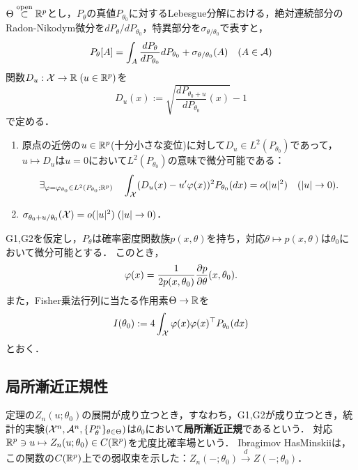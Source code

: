 \documentclass[uplatex,dvipdfmx]{jsreport}
\begin{document}
\begin{notation}[正則性の仮定]
    $\Theta\overset{\mathrm{open}}{\subset}\mathbb{R}^p$とし，$P_\theta$の真値$P_{\theta_0}$に対するLebesgue分解における，絶対連続部分のRadon-Nikodym微分を$dP_\theta/dP_{\theta_0}$，特異部分を$\sigma_{\theta/\theta_0}$で表すと，
    \[P_\theta[A]=\int_A\frac{dP_\theta}{dP_{\theta_0}}dP_{\theta_0}+\sigma_{\theta/\theta_0}(A)\quad(A\in\mathcal{A})\]
    関数$D_u:\mathcal{X}\to\mathbb{R}\;(u\in\mathbb{R}^p)$を
    \[D_u(x):=\sqrt{\frac{dP_{\theta_0+u}}{dP_{\theta_0}}(x)}-1\]
    で定める．
\end{notation}

\begin{enumerate}[({G}1)]
    \item 原点の近傍の$u\in\mathbb{R}^p$(十分小さな変位)に対して$D_u\in L^2(P_{\theta_0})$であって，$u\mapsto D_u$は$u=0$において$L^2(P_{\theta_0})$の意味で微分可能である：
    \[\exists_{\varphi=\varphi_{\theta_0}\in L^2(P_{\theta_0};\mathbb{R}^p)}\quad\int_{\mathcal{X}}(D_u(x)-u'\varphi(x))^2P_{\theta_0}(dx)=o(\lvert u\rvert^2)\quad(\lvert u\rvert\to0).\]
    \item $\sigma_{\theta_0+u/\theta_0}(\mathcal{X})=o(\lvert u\rvert^2)\;(\lvert u\rvert\to0)$．
\end{enumerate}

\begin{lemma}[$L^2$-微分の表示]
    G1,G2を仮定し，$P_\theta$は確率密度関数族$p(x,\theta)$を持ち，対応$\theta\mapsto p(x,\theta)$は$\theta_0$において微分可能とする．
    このとき，
    \[\varphi(x)=\frac{1}{2p(x,\theta_0)}\frac{\partial p}{\partial \theta}(x,\theta_0).\]
    また，Fisher乗法行列に当たる作用素$\Theta\to\mathbb{R}$を
    \[I(\theta_0):=4\int_{\mathcal{X}}\varphi(x)\varphi(x)^\top P_{\theta_0}(dx)\]
    とおく．
\end{lemma}

\begin{lemma}
    
\end{lemma}

\subsection{局所漸近正規性}

\begin{tcolorbox}[colframe=ForestGreen, colback=ForestGreen!10!white,breakable,colbacktitle=ForestGreen!40!white,coltitle=black,fonttitle=\bfseries\sffamily,
title=]
    定理の$Z_n(u;\theta_0)$の展開が成り立つとき，すなわち，G1,G2が成り立つとき，統計的実験$(\mathcal{X}^n,\mathcal{A}^n,\{P^n_\theta\}_{\theta\in\Theta})$は$\theta_0$において\textbf{局所漸近正規}であるという．
    対応$\mathbb{R}^p\ni u\mapsto Z_n(u;\theta_0)\in C(\mathbb{R}^p)$を尤度比確率場という．
    Ibragimov HasMinskiiは，この関数の$C(\mathbb{R}^p)$上での弱収束を示した：$Z_n(-;\theta_0)\xrightarrow{d}Z(-;\theta_0)$．
\end{tcolorbox}
\end{document}
